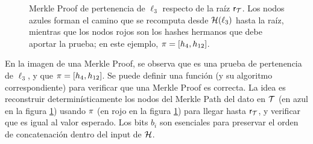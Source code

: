 \begin{figure}[!t]
	\centering
	\caption{Merkle Proof de pertenencia de $\ell_3$ respecto de la raíz $\mathsf{r}_{\mathcal{T}}$. Los nodos azules forman el camino que se recomputa desde $\mathcal{H}(\ell_3)$ hasta la raíz, mientras que los nodos rojos son los hashes hermanos que debe aportar la prueba; en este ejemplo, $\pi=[h_4,h_{12}]$.}
	\label{fig:verify-merkle-proof}
\end{figure}

En la imagen de una Merkle Proof, se observa que es una prueba de pertenencia de $\ell_3$, y que $\pi = [h_4, h_{12}]$. Se puede definir una función (y su algoritmo correspondiente) para verificar que una Merkle Proof es correcta. La idea es reconstruir determinísticamente los nodos del Merkle Path del dato en $\mathcal{T}$ (en azul en la figura \ref{fig:verify-merkle-proof}) usando $\pi$ (en rojo en la figura \ref{fig:verify-merkle-proof}) para llegar hasta $\mathsf{r}_{\mathcal{T}}$, y verificar que es igual al valor esperado. Los bits $b_i$ son esenciales para preservar el orden de concatenación dentro del input de $\mathcal{H}$.

